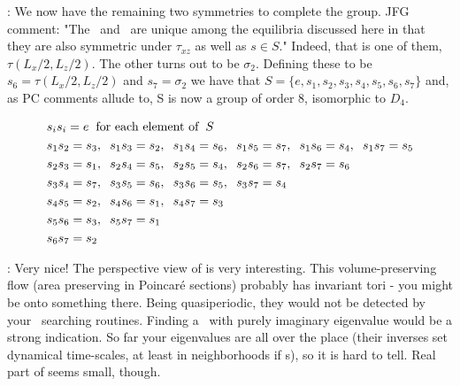    \medskip{}: We now have the
   remaining two symmetries to complete the group. JFG comment:
"The \tEQsev\ and \tEQeight\ are unique among the equilibria
discussed here in that they are also symmetric under $\tau_{xz}$ as
well as $s \in S$." Indeed, that is one of them,
$\tau(L_x/2,L_z/2)$. The other turns out to be $\sigma_2$. Defining
these to be $s_6 = \tau(L_x/2,L_z/2)$ and $s_7 = \sigma_2$ we have
that $S = \{e, s_1, s_2, s_3, s_4, s_5, s_6, s_7\}$ and, as PC
comments allude to, S is now a group of order 8, isomorphic to
$D_4$.

 \begin{align}
 &s_is_i = e \hspace{2 mm}\text{for each element of}\hspace{2 mm} S \\
 &s_1s_2 = s_3,\hspace{2 mm} s_1s_3 = s_2,\hspace{2 mm} s_1s_4 = s_6,\hspace{2 mm} s_1s_5 =
 s_7,\hspace{2 mm} s_1s_6 = s_4,\hspace{2 mm} s_1s_7 = s_5 \\
 &s_2s_3 = s_1,\hspace{2 mm} s_2s_4 = s_5,\hspace{2 mm} s_2s_5 = s_4,\hspace{2 mm} s_2s_6 =
 s_7,\hspace{2 mm} s_2s_7 = s_6 \\
 &s_3s_4 = s_7,\hspace{2 mm} s_3s_5 = s_6,\hspace{2 mm} s_3s_6 = s_5,\hspace{2 mm} s_3s_7 =
 s_4 \\
 &s_4s_5 = s_2,\hspace{2 mm} s_4s_6 = s_1,\hspace{2 mm} s_4s_7 = s_3 \\
 &s_5s_6 = s_3,\hspace{2 mm} s_5s_7 = s_1 \\
 &s_6s_7 = s_2 \\
  \end{align}



\medskip{}:
Very nice!
The perspective view of  is very interesting.
This volume-preserving flow (area preserving in Poincar\'e sections) probably
has invariant tori - you might be onto something there. Being quasiperiodic,
they would not be detected by your \eqva\ searching routines. Finding
a \stagp\ with purely imaginary eigenvalue would be a strong indication.
So far your eigenvalues are all over the place (their inverses set
dynamical time-scales, at least in neighborhoods if \stagp s), so
it is hard to tell.
Real part of  seems small, though.



